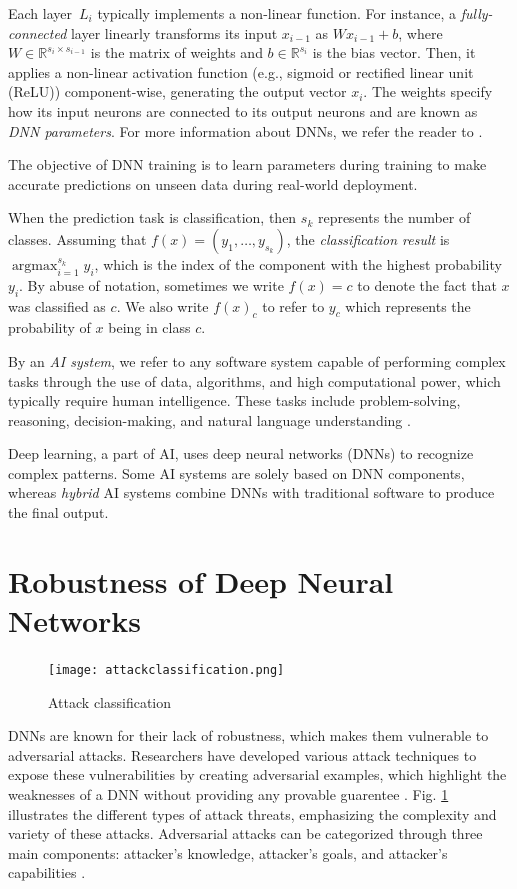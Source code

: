 Each layer~$L_i$ typically implements a non-linear function. For instance, a \emph{fully-connected} layer linearly transforms its input $x_{i-1}$ as $W x_{i-1} + b$, where $W\in\mathbb{R}^{s_{i} \times s_{i-1}}$ is the matrix of weights and $b\in\mathbb{R}^{s_i}$ is the bias vector. Then, it applies a non-linear activation function (e.g., sigmoid or rectified linear unit (ReLU)) component-wise, generating the output vector $x_i$. The weights specify how its input neurons are connected to its output neurons and are known as \emph{DNN parameters}. For more information about DNNs, we refer the reader to \cite{dnn_archi, Hassija, Liang}.

The objective of DNN training is to learn parameters during training to make accurate predictions on unseen data during real-world deployment.

When the prediction task is classification, then $s_k$ represents the number of classes. Assuming that $f(x) = (y_1,\dots,y_{s_k})$, the \emph{classification result} is $\displaystyle\mathop{\text{argmax}}_{i=1}^{s_k} y_i$, which is the index of the component with the highest probability $y_i$. By abuse of notation, sometimes we write $f(x)=c$ to denote the fact that $x$ was classified as $c$. We also write $f(x)_c$ to refer to $y_c$ which represents the probability of $x$ being in class $c$.

By an \emph{AI system}, we refer to any software system capable of performing complex tasks through the use of data, algorithms, and high computational power, which typically require human intelligence. These tasks include problem-solving, reasoning, decision-making, and natural language understanding \cite{Illinois}.

Deep learning, a part of AI, uses deep neural networks (DNNs) to recognize complex patterns. Some AI systems are solely based on DNN components, whereas \emph{hybrid} AI systems combine DNNs with traditional software to produce the final output.

\section{Robustness of Deep Neural Networks}

\begin{figure}[h]
  \centering
  \texttt{[image: attackclassification.png]}
  \caption{Attack classification}
  \label{fig:adv_threats}
\end{figure}


DNNs are known for their lack of robustness, which makes them vulnerable to adversarial attacks. Researchers have developed various attack techniques to expose these vulnerabilities by creating adversarial examples, which highlight the weaknesses of a DNN without providing any provable guarentee \cite{HuangX}. Fig. \ref{fig:adv_threats}  illustrates the different types of attack threats, emphasizing the complexity and variety of these attacks. Adversarial attacks can be categorized through three main components: attacker's knowledge, attacker's goals, and attacker's capabilities \cite{Biggio}.

